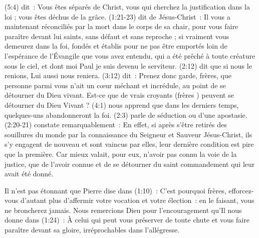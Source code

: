 \begin{enumerate}
\begin{pocketpar}{}
\begin{digestpar}{}
(5:4) dit~:
 \og Vous êtes séparés de Christ, vous qui cherchez la justification
 dans la loi ; vous êtes déchus de la grâce. \fg{}
 (1:21-23) dit de Jésus-Christ~:
 \og Il vous a maintenant réconciliés par la mort dans le corps de sa chair,
 pour vous faire paraître devant lui saints, sans défaut et sans reproche ;
 si vraiment vous demeurez dans la foi, fondés et établis pour ne pas être
 emportés loin de l'espérance de l'Évangile que vous avez entendu,
 qui a été prêché à toute créature sous le ciel, et dont moi Paul
 je suis devenu le serviteur. \fg{}
 (2:12) dit que \og si nous le renions, Lui aussi nous reniera. \fg{}
 (3:12) dit~:
 \og Prenez donc garde, frères, que personne parmi vous n'ait un cœur méchant
 et incrédule, au point de se détourner du Dieu vivant. \fg{}
 Est-ce que de vrais croyants (\og frères \fg{}) peuvent se détourner du Dieu Vivant ?
 (4:1) nous apprend que \og dans les derniers temps,
 quelques-uns abandonneront la foi. \fg{}
 (2:3) parle de \og séduction \fg{} ou d'une apostasie.
 (2:20-21) constate remarquablement~: \og En effet, si après s'être retirés
 des souillures du monde par la connaissance du Seigneur et Sauveur Jésus-Christ,
 ils s'y engagent de nouveau et sont vaincus par elles, leur dernière condition
 est pire que la première.
 Car mieux valait, pour eux, n'avoir pas connu la voie de la justice,
 que de l'avoir connue et de se détourner du saint commandement
 qui leur avait été donné. \fg{}
\end{digestpar}
\end{pocketpar}

\begin{pocketpar}{}
\begin{digestpar}{}
Il n'est pas étonnant que Pierre dise dans (1:10)~:
 \og C'est pourquoi frères, efforcez-vous d'autant plus d'affermir
 votre vocation et votre élection~: en le faisant, vous ne broncherez jamais. \fg{}
Nous remercions Dieu pour l'encouragement qu'Il nous donne dans (1:24)~:
 \og À celui qui peut vous préserver de toute chute et vous faire paraître
 devant sa gloire, irréprochables dans l'allégresse. \fg{}
\end{digestpar}
\end{pocketpar}


\end{enumerate}
